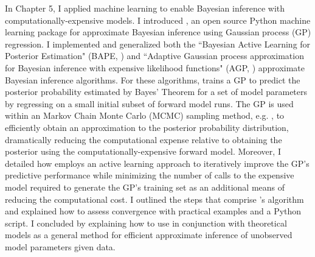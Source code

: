 In Chapter 5, I applied machine learning to enable Bayesian inference with computationally-expensive models. I introduced \approxposterior, an open source Python machine learning package for approximate Bayesian inference using Gaussian process (GP) regression. I implemented and generalized both the ``Bayesian Active Learning for Posterior Estimation" (BAPE, \citet{Kandasamy2017}) and ``Adaptive Gaussian process approximation for Bayesian inference with expensive likelihood functions" (AGP, \citet{Wang2018}) approximate Bayesian inference algorithms. For these algorithms, \approxposterior trains a GP to predict the posterior probability estimated by Bayes' Theorem for a set of model parameters by regressing on a small initial subset of forward model runs. The GP is used within an Markov Chain Monte Carlo (MCMC) sampling method, e.g. \emcee, to efficiently obtain an approximation to the posterior probability distribution, dramatically reducing the computational expense relative to obtaining the posterior using the computationally-expensive forward model. Moreover, I detailed how \approxposterior employs an active learning approach to iteratively improve the GP's predictive performance while minimizing the number of calls to the expensive model required to generate the GP's training set as an additional means of reducing the computational cost.  I outlined the steps that comprise \approxposterior's algorithm and explained how to assess convergence with practical examples and a Python script. I concluded by explaining how to use \approxposterior in conjunction with theoretical models as a general method for efficient approximate inference of unobserved model parameters given data.
 
